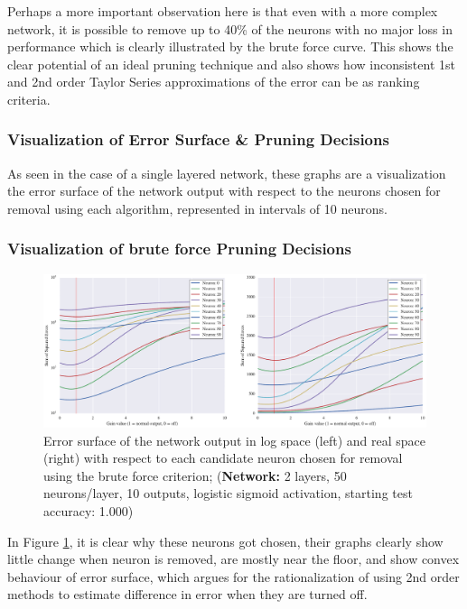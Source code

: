 Perhaps a more important observation here is that even with a more complex network, it is possible to remove up to 40\% of the neurons with no major loss in performance which is clearly illustrated by the brute force curve. This shows the clear potential of an ideal pruning technique and also shows how inconsistent 1st and 2nd order Taylor Series approximations of the error can be as ranking criteria.

\subsubsection{Visualization of Error Surface \& Pruning Decisions}
As seen in the case of a single layered network, these graphs are a visualization the error surface of the network output with respect to the neurons chosen for removal using each algorithm, represented in intervals of 10 neurons. 

\subsubsection{Visualization of brute force Pruning Decisions}
\begin{figure}[!ht]
\centering
\includegraphics[width=\linewidth]{mnist-deep-gt-gain.pdf}
\caption{Error surface of the network output in log space (left) and real space (right) with respect to each candidate neuron chosen for removal using the brute force criterion; (\textbf{Network:} 2 layers, 50 neurons/layer, 10 outputs, logistic sigmoid activation, starting test accuracy: 1.000)}
\label{fig:mnist-gt-double-layer}
\end{figure}

In Figure \ref{fig:mnist-gt-double-layer}, it is clear why these neurons got chosen, their graphs clearly show little change when neuron is removed, are mostly near the floor, and show convex behaviour of error surface, which argues for the rationalization of using 2nd order methods to estimate difference in error when they are turned off.


